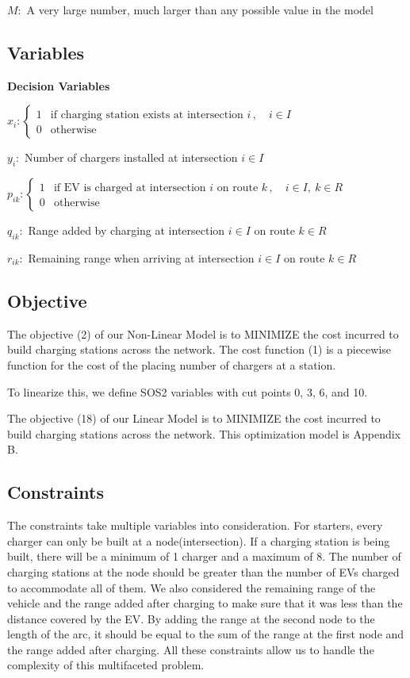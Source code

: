 \documentclass[12pt, fleqn]{article}
\begin{document}
$M:$ A very large number, much larger than any possible value in the model


\subsection{Variables}

\textbf{Decision Variables}

$x_{i}: \begin{cases}
        1 & \text{if charging station exists at intersection } i \,, \quad i \in I \\
        0 & \text{otherwise}
    \end{cases}$

$y_{i}:$ Number of chargers installed at intersection $i \in I$

$p_{ik}: \begin{cases}
        1 & \text{if EV is charged at intersection } i \text{ on route } k \,, \quad i \in I,\ k \in R \\
        0 & \text{otherwise}
    \end{cases}$

$q_{ik}:$ Range added by charging at intersection $i \in I$ on route $k \in R$

$r_{ik}:$ Remaining range when arriving at intersection $i \in I$ on route $k \in R$

\subsection{Objective}

The objective (2) of our Non-Linear Model is to MINIMIZE the cost incurred to build charging stations across the network. The cost function (1) is a piecewise function for the cost of the placing number of chargers at a station.

To linearize this, we define SOS2 variables with cut points 0, 3, 6, and 10.

The objective (18) of our Linear Model is to MINIMIZE the cost incurred to build charging stations across the network. This optimization model is Appendix B.


\subsection{Constraints}

The constraints take multiple variables into consideration. For starters, every charger can only be built at a node(intersection).
If a charging station is being built, there will be a minimum of 1 charger and a maximum of 8. The number of charging stations at
the node should be greater than the number of EVs charged to accommodate all of them. We also considered the remaining range of the
vehicle and the range added after charging  to make sure that it was less than the distance covered by the EV. By adding the range
at the second node to the length of the arc, it should be equal to the sum of the range at the first node and the range added after
charging. All these constraints allow us to handle the complexity of this multifaceted problem.
\end{document}
